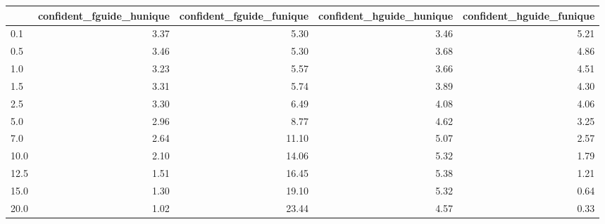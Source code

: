 \begin{tabular}{lrrrr}
\toprule
 & confident_fguide_hunique & confident_fguide_funique & confident_hguide_hunique & confident_hguide_funique \\
\midrule
0.1 & 3.37 & 5.30 & 3.46 & 5.21 \\
0.5 & 3.46 & 5.30 & 3.68 & 4.86 \\
1.0 & 3.23 & 5.57 & 3.66 & 4.51 \\
1.5 & 3.31 & 5.74 & 3.89 & 4.30 \\
2.5 & 3.30 & 6.49 & 4.08 & 4.06 \\
5.0 & 2.96 & 8.77 & 4.62 & 3.25 \\
7.0 & 2.64 & 11.10 & 5.07 & 2.57 \\
10.0 & 2.10 & 14.06 & 5.32 & 1.79 \\
12.5 & 1.51 & 16.45 & 5.38 & 1.21 \\
15.0 & 1.30 & 19.10 & 5.32 & 0.64 \\
20.0 & 1.02 & 23.44 & 4.57 & 0.33 \\
\bottomrule
\end{tabular}
